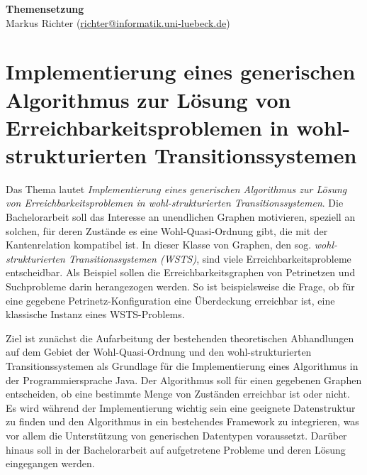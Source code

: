 \documentclass[
  a4paper,               %
  twoside,               %
  headings=small,        %
  DIV=12,                %
  BCOR=1cm,              %
  headinclude=true,      %
  footinclude=true,      %
  numbers=noenddot,      %
  11pt]{scrartcl}        %
\begin{document}
\begin{center}
\textbf{\huge Themensetzung} \\[1em]
Markus Richter (\url{richter@informatik.uni-luebeck.de})
\end{center}


\section*{Implementierung eines generischen Algorithmus zur Lösung von Erreichbarkeitsproblemen in wohl-strukturierten Transitionssystemen}
 
Das Thema lautet \emph{Implementierung eines generischen Algorithmus zur Lösung von Erreichbarkeitsproblemen in wohl-strukturierten Transitionssystemen}. Die Bachelorarbeit soll das Interesse an unendlichen Graphen motivieren, speziell an solchen, für deren Zustände es eine Wohl-Quasi-Ordnung gibt, die mit der Kantenrelation kompatibel ist. In dieser Klasse von Graphen, den sog. \emph{wohl-strukturierten Transitionssystemen (WSTS)}, sind viele Erreichbarkeitsprobleme entscheidbar. Als Beispiel sollen die Erreichbarkeitsgraphen von Petrinetzen und Suchprobleme darin herangezogen werden. So ist beispielsweise die Frage, ob für eine gegebene Petrinetz-Konfiguration eine Überdeckung erreichbar ist, eine klassische Instanz eines WSTS-Problems. 

Ziel ist zunächst die Aufarbeitung der bestehenden theoretischen Abhandlungen auf dem Gebiet der Wohl-Quasi-Ordnung und den wohl-strukturierten Transitionssystemen als Grundlage für die Implementierung eines Algorithmus in der Programmiersprache Java. Der Algorithmus soll für einen gegebenen Graphen entscheiden, ob eine bestimmte Menge von Zuständen erreichbar ist oder nicht. Es wird während der Implementierung wichtig sein eine geeignete Datenstruktur zu finden und den Algorithmus in ein bestehendes Framework zu integrieren, was vor allem die Unterstützung von generischen Datentypen voraussetzt. Darüber hinaus soll in der Bachelorarbeit auf aufgetretene Probleme und deren Lösung eingegangen werden. 
\end{document}
